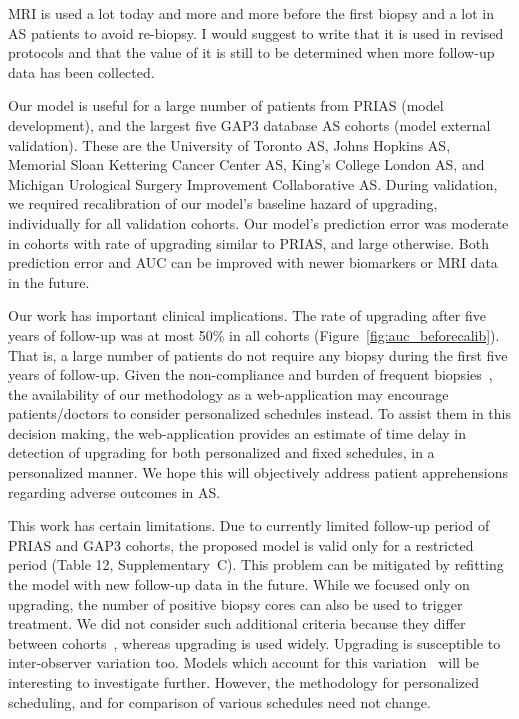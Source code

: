 MRI is used a lot today and more and more before the first biopsy and a lot in AS patients to avoid re-biopsy. I would suggest to write that it is used in revised protocols and that the value of it is still to be determined when more follow-up data has been collected.

Our model is useful for a large number of patients from PRIAS (model development), and the largest five GAP3 database AS cohorts (model external validation). These are the University of Toronto AS, Johns Hopkins AS, Memorial Sloan Kettering Cancer Center AS, King's College London AS, and Michigan Urological Surgery Improvement Collaborative AS. During validation, we required recalibration of our model's baseline hazard of upgrading, individually for all validation cohorts. Our model's prediction error was moderate in cohorts with rate of upgrading similar to PRIAS, and large otherwise. Both prediction error and AUC can be improved with newer biomarkers or MRI data in the future.

Our work has important clinical implications. The rate of upgrading after five years of follow-up was at most 50\% in all cohorts (Figure~\ref{fig:auc_beforecalib}). That is, a large number of patients do not require any biopsy during the first five years of follow-up. Given the non-compliance and burden of frequent biopsies~\citep{bokhorst2015compliance}, the availability of our methodology as a web-application may encourage patients/doctors to consider personalized schedules instead. To assist them in this decision making, the web-application provides an estimate of time delay in detection of upgrading for both personalized and fixed schedules, in a personalized manner. We hope this will objectively address patient apprehensions regarding adverse outcomes in AS.

This work has certain limitations. Due to currently limited follow-up period of PRIAS and GAP3 cohorts, the proposed model is valid only for a restricted period (Table 12, Supplementary~C). This problem can be mitigated by refitting the model with new follow-up data in the future. While we focused only on upgrading, the number of positive biopsy cores can also be used to trigger treatment. We did not consider such additional criteria because they differ between cohorts~\citep{nieboer2018active}, whereas upgrading is used widely. Upgrading is susceptible to inter-observer variation too. Models which account for this variation~\citep{coley2017prediction,balasubramanian2003estimation} will be interesting to investigate further. However, the methodology for personalized scheduling, and for comparison of various schedules need not change.